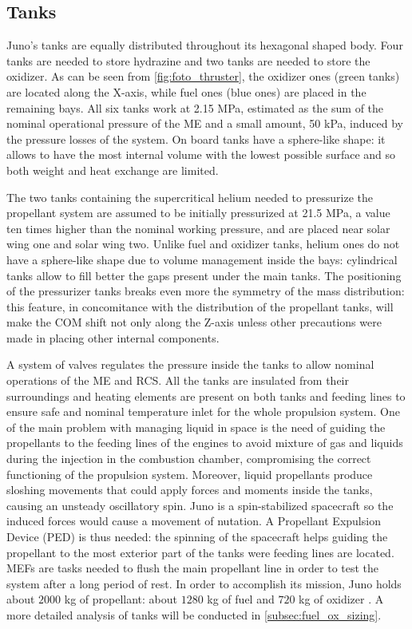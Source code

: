 \subsection{Tanks} 
\label{subsec:tanks}

Juno's tanks are equally distributed throughout its hexagonal shaped body. Four tanks are needed to store hydrazine and two tanks are needed to store the oxidizer. As can be seen from \autoref{fig:foto_thruster}, the oxidizer ones (green tanks) are located along the X-axis, while fuel ones (blue ones) are placed in the remaining bays. All six tanks work at 2.15 MPa, estimated as the sum of the nominal operational pressure of the ME and a small amount, 50 kPa, induced by the pressure losses of the system\cite{Leros}. On board tanks have a sphere-like shape: it allows to have the most internal volume with the lowest possible surface and so both weight and heat exchange are limited.

The two tanks\cite{2tankshe} containing the supercritical helium needed to pressurize the propellant system are assumed to be initially pressurized at 21.5 MPa, a value ten times higher than the nominal working pressure, and are placed near solar wing one and solar wing two. Unlike fuel and oxidizer tanks, helium ones do not have a sphere-like shape due to volume management inside the bays\cite{he_tank}: cylindrical tanks allow to fill better the gaps present under the main tanks. The positioning of the pressurizer tanks breaks even more the symmetry of the mass distribution: this feature, in concomitance with the distribution of the propellant tanks, will make the COM shift not only along the Z-axis unless other precautions were made in placing other internal components. 

A system of valves regulates the pressure inside the tanks to allow nominal operations of the ME and RCS. All the tanks are insulated from their surroundings and heating elements are present on both tanks and feeding lines to ensure safe and nominal temperature inlet for the whole propulsion system.
One of the main problem with managing liquid in space is the need of guiding the propellants to the feeding lines of the engines to avoid mixture of gas and liquids during the injection in the combustion chamber, compromising the correct functioning of the propulsion system. Moreover, liquid propellants produce sloshing movements that could apply forces and moments inside the tanks, causing an unsteady oscillatory spin. Juno is a spin-stabilized spacecraft so the induced forces would cause a movement of nutation. A Propellant Expulsion Device (PED) is thus needed: the spinning of the spacecraft helps guiding the propellant to the most exterior part of the tanks were feeding lines are located\cite{slosh}.
MEFs are tasks needed to flush the main propellant line in order to test the system after a long period of rest.
In order to accomplish its mission, Juno holds about $2000$ kg of propellant: about $1280$ kg of fuel and $720$ kg of oxidizer \cite{juno_inner}. A more detailed analysis of tanks will be conducted in \autoref{subsec:fuel_ox_sizing}.